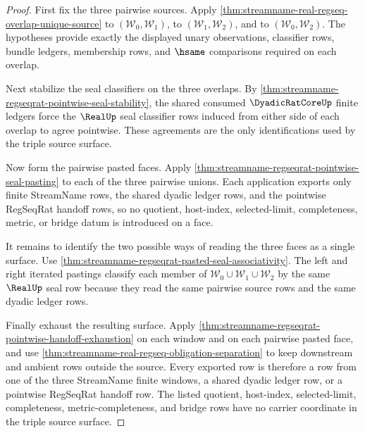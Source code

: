 \begin{proof}
First fix the three pairwise sources. Apply
\autoref{thm:streamname-real-regseq-overlap-unique-source} to
$(\mathcal{W}_0,\mathcal{W}_1)$, to
$(\mathcal{W}_1,\mathcal{W}_2)$, and to
$(\mathcal{W}_0,\mathcal{W}_2)$. The hypotheses provide exactly the displayed
unary observations, classifier rows, bundle ledgers, membership rows, and
$\hsame$ comparisons required on each overlap.

Next stabilize the seal classifiers on the three overlaps. By
\autoref{thm:streamname-regseqrat-pointwise-seal-stability}, the shared
consumed $\DyadicRatCoreUp$ finite ledgers force the $\RealUp$ seal classifier
rows induced from either side of each overlap to agree pointwise. These
agreements are the only identifications used by the triple source surface.

Now form the pairwise pasted faces. Apply
\autoref{thm:streamname-regseqrat-pointwise-seal-pasting} to each of the
three pairwise unions. Each application exports only finite StreamName rows,
the shared dyadic ledger rows, and the pointwise RegSeqRat handoff rows, so no
quotient, host-index, selected-limit, completeness, metric, or bridge datum is
introduced on a face.

It remains to identify the two possible ways of reading the three faces as a
single surface. Use
\autoref{thm:streamname-regseqrat-pasted-seal-associativity}. The left and
right iterated pastings classify each member of
$\mathcal{W}_0 \cup \mathcal{W}_1 \cup \mathcal{W}_2$ by the same
$\RealUp$ seal row because they read the same pairwise source rows and the
same dyadic ledger rows.

Finally exhaust the resulting surface. Apply
\autoref{thm:streamname-regseqrat-pointwise-handoff-exhaustion} on each
window and on each pairwise pasted face, and use
\autoref{thm:streamname-real-regseq-obligation-separation} to keep downstream
and ambient rows outside the source. Every exported row is therefore a row
from one of the three StreamName finite windows, a shared dyadic ledger row,
or a pointwise RegSeqRat handoff row. The listed quotient, host-index,
selected-limit, completeness, metric-completeness, and bridge rows have no
carrier coordinate in the triple source surface.
\end{proof}

